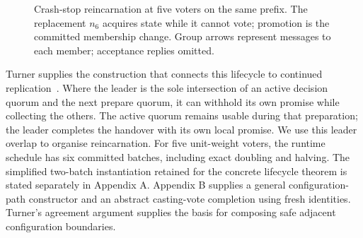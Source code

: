 \documentclass[10pt,journal,letterpaper]{IEEEtran}
\begin{document}
\begin{figure}[t]
\centering
{}
\caption{Crash-stop reincarnation at five voters on the same prefix. The replacement $n_6$ acquires state while it cannot vote; promotion is the committed membership change. Group arrows represent messages to each member; acceptance replies omitted.}
\label{fig:reincarnation-fix5}
\end{figure}

Turner supplies the construction that connects this lifecycle to continued
replication~\cite{turner}.
Where the leader is the sole intersection of an active decision quorum and the
next prepare quorum, it can withhold its own promise while collecting the others.
The active quorum remains usable during that preparation; the leader completes
the handover with its own local promise.
We use this leader overlap to organise reincarnation.
For five unit-weight voters, the runtime schedule has six committed batches,
including exact doubling and halving. The simplified two-batch instantiation
retained for the concrete lifecycle theorem is stated separately in Appendix A.
Appendix B supplies a general configuration-path constructor and an abstract
casting-vote completion using fresh identities. Turner's agreement argument
supplies the basis for composing safe adjacent configuration boundaries.
\end{document}
